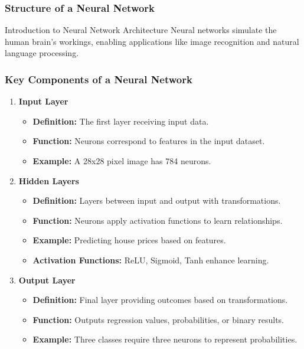 \documentclass[aspectratio=169]{beamer}
\begin{document}
\begin{frame}[fragile]
    \frametitle{Structure of a Neural Network}
    \begin{block}{Introduction to Neural Network Architecture}
        Neural networks simulate the human brain's workings, enabling applications like image recognition and natural language processing. 
    \end{block}
\end{frame}

\begin{frame}[fragile]
    \frametitle{Key Components of a Neural Network}
    \begin{enumerate}
        \item \textbf{Input Layer}
            \begin{itemize}
                \item \textbf{Definition:} The first layer receiving input data.
                \item \textbf{Function:} Neurons correspond to features in the input dataset.
                \item \textbf{Example:} A 28x28 pixel image has 784 neurons.
            \end{itemize}

        \item \textbf{Hidden Layers}
            \begin{itemize}
                \item \textbf{Definition:} Layers between input and output with transformations.
                \item \textbf{Function:} Neurons apply activation functions to learn relationships.
                \item \textbf{Example:} Predicting house prices based on features.
                \item \textbf{Activation Functions:} ReLU, Sigmoid, Tanh enhance learning.
            \end{itemize}
        
        \item \textbf{Output Layer}
            \begin{itemize}
                \item \textbf{Definition:} Final layer providing outcomes based on transformations.
                \item \textbf{Function:} Outputs regression values, probabilities, or binary results.
                \item \textbf{Example:} Three classes require three neurons to represent probabilities.
            \end{itemize}
    \end{enumerate}
\end{frame}
\end{document}
